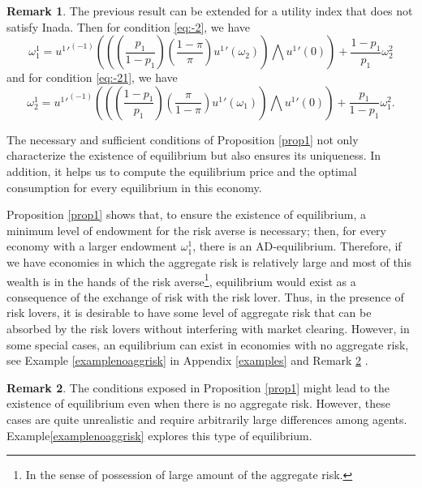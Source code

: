 \documentclass[pdftex]{article}
\numberwithin{equation}{section}
\theoremstyle{th}
\newtheorem{proof lemma}{{Proof Lemma}.}
\theoremstyle{definition}
\newtheorem{remark}{Remark}%
\newtheorem*{risk lovers}{Risk lovers}
\newtheorem*{risk averse}{Risk averse}
\begin{document}
\begin{remark}
\label{remarknoInada}The previous result can be extended for a utility index that does not satisfy Inada. Then for condition \ref{eq:-2}, we have 
\begin{equation}
\label{eq:-2n}
\omega_1^1={{u^1}'}^{(-1)}\left(\left(\left(\frac{p_1}{1-p_1}\right)\left(\frac{1-\pi}{\pi}\right){u^1}'\left(\omega_2\right)\right)\bigwedge{{u^1}'}(0)\right)+\frac{1-p_1}{p_1}\omega_2^2
\end{equation}
 and for condition \ref{eq:-21}, we have 
 \begin{equation}
 \label{eq:-21n}
 \omega_2^1={{u^1}'}^{(-1)}\left(\left(\left(\frac{1-p_1}{p_1}\right)\left(\frac{\pi}{1-\pi}\right){u^1}'\left(\omega_1\right)\right)\bigwedge{{u^1}'}(0)\right)+\frac{p_1}{1-p_1}\omega_1^2.
 \end{equation}
\end{remark}



The necessary and sufficient conditions of Proposition \ref{prop1} not only characterize the existence of equilibrium but also ensures its uniqueness. In addition, it helps us to compute the equilibrium price and the optimal consumption for every equilibrium in this economy.

Proposition \ref{prop1} shows that, to ensure the existence of equilibrium, a minimum level of endowment for the risk averse is necessary; then, for every economy with a larger endowment $\omega_1^1$, there is an AD-equilibrium. Therefore, if we have economies in which the aggregate risk is relatively large and most of this wealth is in the hands of the risk averse\footnote{In the sense of possession of large amount of the aggregate risk.}, equilibrium would exist as a consequence of the exchange of risk with the risk lover. Thus, in the presence of risk lovers, it is desirable to have some level of aggregate risk that can be absorbed by the risk lovers without interfering with market clearing. However, in some special cases, an equilibrium can exist in economies with no aggregate risk, see Example \ref{examplenoaggrisk} in Appendix \ref{examples} and Remark \ref{remark8} .



\begin{remark}
\label{remark8}
The conditions exposed in Proposition \ref{prop1} might lead to the existence of equilibrium even when there is no aggregate risk. However, these cases are quite unrealistic and require arbitrarily large differences among agents. Example\ref{examplenoaggrisk} explores this type of equilibrium.
\end{remark}
\end{document}
